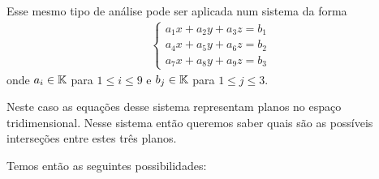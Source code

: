 Esse mesmo tipo de análise pode ser aplicada num sistema da forma
\begin{align}
    \begin{cases}\label{sistema_linear_3x3}
        a_1x + a_2y + a_3z = b_1\\
        a_4x + a_5y + a_6z = b_2\\
        a_7x + a_8y + a_9z = b_3
    \end{cases}
\end{align}
onde $a_i \in \mathbb{K}$ para $1 \le i \le 9$ e $b_j \in \mathbb{K}$ para $1 \le j \le 3$.

Neste caso as equaç\~oes desse sistema representam planos no espaço tridimensional. Nesse sistema então queremos saber quais são as possíveis interseç\~oes entre estes tr\^es planos.

Temos então as seguintes possibilidades:

